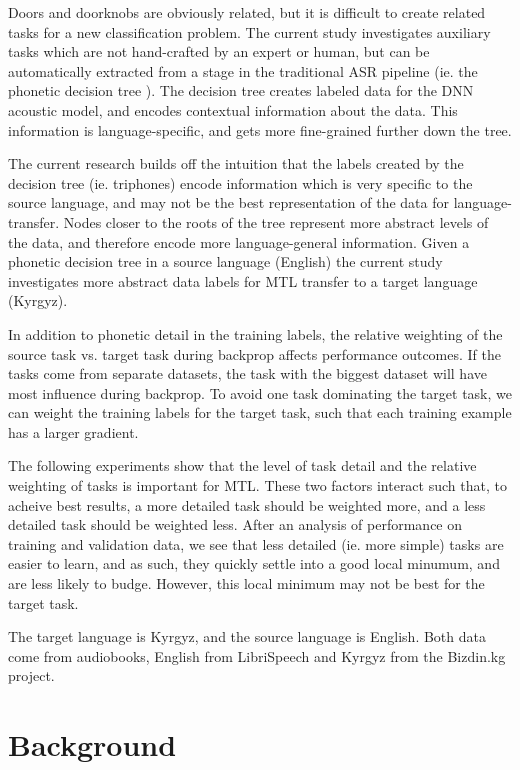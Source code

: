 \documentclass[a4paper]{article}
\begin{document}
Doors and doorknobs are obviously related, but it is difficult to create related tasks for a new classification problem. The current study investigates auxiliary tasks which are not hand-crafted by an expert or human, but can be automatically extracted from a stage in the traditional ASR pipeline (ie. the phonetic decision tree \cite{young1994tree}). The decision tree creates labeled data for the DNN acoustic model, and encodes contextual information about the data. This information is language-specific, and gets more fine-grained further down the tree.

The current research builds off the intuition that the labels created by the decision tree (ie. triphones) encode information which is very specific to the source language, and may not be the best representation of the data for language-transfer. Nodes closer to the roots of the tree represent more abstract levels of the data, and therefore encode more language-general information. Given a phonetic decision tree in a source language (English) the current study investigates more abstract data labels for MTL transfer to a target language (Kyrgyz).

In addition to phonetic detail in the training labels, the relative weighting of the source task vs. target task during backprop affects performance outcomes. If the tasks come from separate datasets, the task with the biggest dataset will have most influence during backprop. To avoid one task dominating the target task, we can weight the training labels for the target task, such that each training example has a larger gradient.

The following experiments show that the level of task detail and the relative weighting of tasks is important for MTL. These two factors interact such that, to acheive best results, a more detailed task should be weighted more, and a less detailed task should be weighted less. After an analysis of performance on training and validation data, we see that less detailed (ie. more simple) tasks are easier to learn, and as such, they quickly settle into a good local minumum, and are less likely to budge. However, this local minimum may not be best for the target task.

The target language is Kyrgyz, and the source language is English. Both data come from audiobooks, English from LibriSpeech \cite{panayotov2015} and Kyrgyz from the Bizdin.kg project.




\section{Background}
\end{document}
